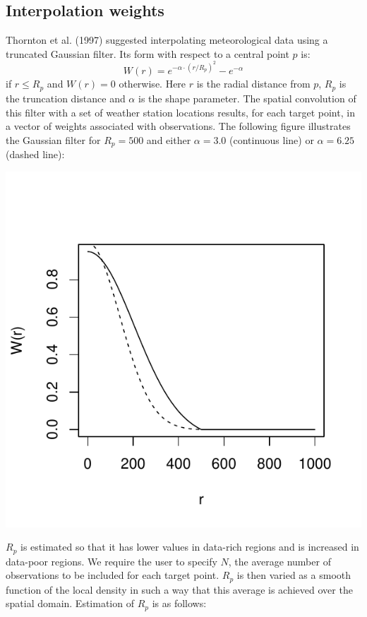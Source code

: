 \documentclass[11pt,a4paper]{article}
\begin{document}
\subsection{Interpolation weights}
Thornton et al. (1997) suggested interpolating meteorological data using a truncated Gaussian filter. Its form with respect to a central point $p$ is:
\begin{equation}
W(r) = e^{-\alpha \cdot (r/R_p)^2} - e^{-\alpha}
\end{equation}
if $r \leq R_p$ and $W(r) = 0$ otherwise. Here $r$ is the radial distance from $p$, $R_p$ is the truncation distance and $\alpha$ is the shape parameter. The spatial convolution of this filter with a set of weather station locations results, for each target point, in a vector of weights associated with observations. The following figure illustrates the Gaussian filter for $R_p = 500$ and either $\alpha = 3.0$ (continuous line) or $\alpha = 6.25$ (dashed line):
\begin{center}
\includegraphics{Meteorology-010}
\end{center}
$R_p$ is estimated so that it has lower values in data-rich regions and is increased in data-poor regions. We require the user to specify $N$, the average number of observations to be included for each target point. $R_p$ is then varied as a smooth function of the local density in such a way that this average is achieved over the spatial domain. Estimation of $R_p$ is as follows:
\end{document}
